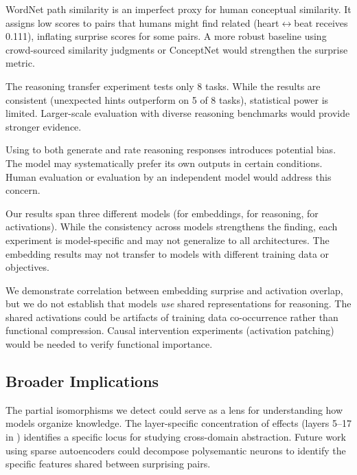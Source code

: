 WordNet path similarity is an imperfect proxy for human conceptual similarity.
It assigns low scores to pairs that humans might find related (\eg heart$\leftrightarrow$beat receives 0.111), inflating surprise scores for some pairs.
A more robust baseline using crowd-sourced similarity judgments or ConceptNet would strengthen the surprise metric.

The reasoning transfer experiment tests only 8 tasks.
While the results are consistent (unexpected hints outperform on 5 of 8 tasks), statistical power is limited.
Larger-scale evaluation with diverse reasoning benchmarks would provide stronger evidence.

Using \gptfour to both generate and rate reasoning responses introduces potential bias.
The model may systematically prefer its own outputs in certain conditions.
Human evaluation or evaluation by an independent model would address this concern.

Our results span three different models (\embmodel for embeddings, \gptfour for reasoning, \pythia for activations).
While the consistency across models strengthens the finding, each experiment is model-specific and may not generalize to all architectures.
The embedding results may not transfer to models with different training data or objectives.

We demonstrate correlation between embedding surprise and activation overlap, but we do not establish that models \emph{use} shared representations for reasoning.
The shared activations could be artifacts of training data co-occurrence rather than functional compression.
Causal intervention experiments (\eg activation patching) would be needed to verify functional importance.

\subsection{Broader Implications}

The partial isomorphisms we detect could serve as a lens for understanding how models organize knowledge.
The layer-specific concentration of effects (layers 5--17 in \pythia) identifies a specific locus for studying cross-domain abstraction.
Future work using sparse autoencoders \citep{bricken2023monosemanticity} could decompose polysemantic neurons to identify the specific features shared between surprising pairs.

